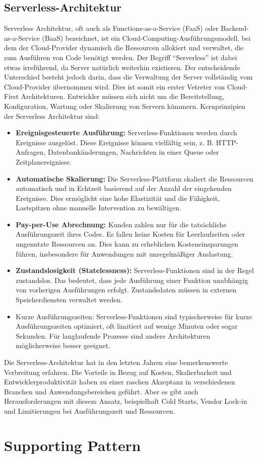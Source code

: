 \documentclass[../vs-script-first-v01.tex]{subfiles}
\begin{document}
\subsection{Serverless-Architektur}
Serverless Architektur, oft auch als Functions-as-a-Service (FaaS) oder Backend-as-a-Service (BaaS) bezeichnet, ist ein Cloud-Computing-Ausführungsmodell, bei dem der Cloud-Provider dynamisch die Ressourcen allokiert und verwaltet, die zum Ausführen von Code benötigt werden. Der Begriff \enquote{Serverless} ist dabei etwas irreführend, da Server natürlich weiterhin existieren. Der entscheidende Unterschied besteht jedoch darin, dass die Verwaltung der Server vollständig vom Cloud-Provider übernommen wird. Dies ist somit ein erster Vetreter von Cloud-First Architekturen. Entwickler müssen sich nicht um die Bereitstellung, Konfiguration, Wartung oder Skalierung von Servern kümmern. Kernprinzipien der Serverless Architektur sind:
\begin{itemize}
\item \textbf{Ereignisgesteuerte Ausführung:} Serverless-Funktionen werden durch Ereignisse ausgelöst. Diese Ereignisse können vielfältig sein, z. B. HTTP-Anfragen, Datenbankänderungen, Nachrichten in einer Queue oder Zeitplanereignisse.
\item \textbf{Automatische Skalierung:} Die Serverless-Plattform skaliert die Ressourcen automatisch und in Echtzeit basierend auf der Anzahl der eingehenden Ereignisse. Dies ermöglicht eine hohe Elastizität und die Fähigkeit, Lastspitzen ohne manuelle Intervention zu bewältigen.
\item \textbf{Pay-per-Use Abrechnung:} Kunden zahlen nur für die tatsächliche Ausführungszeit ihres Codes. Es fallen keine Kosten für Leerlaufzeiten oder ungenutzte Ressourcen an. Dies kann zu erheblichen Kosteneinsparungen führen, insbesondere für Anwendungen mit unregelmäßiger Auslastung.
\item \textbf{Zustandslosigkeit (Statelessness):} Serverless-Funktionen sind in der Regel zustandslos. Das bedeutet, dass jede Ausführung einer Funktion unabhängig von vorherigen Ausführungen erfolgt. Zustandsdaten müssen in externen Speicherdiensten verwaltet werden.
\item Kurze Ausführungszeiten: Serverless-Funktionen sind typischerweise für kurze Ausführungszeiten optimiert, oft limitiert auf wenige Minuten oder sogar Sekunden. Für langlaufende Prozesse sind andere Architekturen möglicherweise besser geeignet.
\end{itemize}
Die Serverless-Architektur hat in den letzten Jahren eine bemerkenswerte Verbreitung erfahren.  Die Vorteile in Bezug auf Kosten, Skalierbarkeit und Entwicklerproduktivität haben zu einer raschen Akzeptanz in verschiedenen Branchen und Anwendungsbereichen geführt. Aber es gibt auch Herausforderungen mit diesem Ansatz, beispielhaft Cold Starts, Vendor Lock-in und Limitierungen bei Ausführungszeit und Ressourcen. 
\newpage
\label{Woche04}\section{Supporting Pattern}
\end{document}
